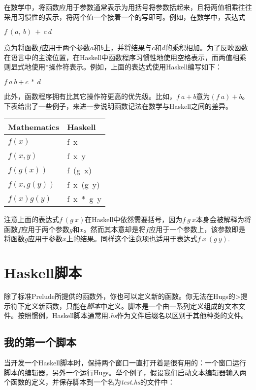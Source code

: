在数学中，将函数应用于参数通常表示为用括号将参数括起来，且将两值相乘往往采用习惯性的表示，将两个值一个接着一个的写即可。例如，在数学中，表达式

\noindent\hspace*{1cm} $f~(a,~b)~+~c~d$

意为将函数$f$应用于两个参数$a$和$b$上，并将结果与$c$和$d$的乘积相加。为了反映函数在语言中的主流位置，在Haskell中函数程序习惯性地使用空格表示，而两值相乘则显式地使用$*$操作符表示。例如，上面的表达式使用Haskell编写如下：

\noindent\hspace*{1cm} $f~a~b + c~*~d$

此外，函数程序拥有比其它操作符更高的优先级。比如，$f~a + b$意为$(f~a) +
b$。下表给出了一些例子，来进一步说明函数记法在数学与Haskell之间的差异。

\begin{table}[htbp]
\label{tab:threesome}
\centering
\begin{tabular}{ll}
\hline
Mathematics & Haskell  \\
\hline
$f(x)$ & f~x \\
$f(x,y)$ & f~x~y \\
$f(g(x))$ & f~(g~x) \\
$f(x,g(y))$ & f~x~(g~y)\\
$f(x)g(y)$ & f~x~*~g~y\\
\hline
\end{tabular}
\end{table}

注意上面的表达式$f~(g~x)$在Haskell中依然需要括号，因为$f~g~
x$本身会被解释为将函数$f$应用于两个参数$g$和$x$。然而其本意却是将$f$应用于一个参数上，该参数即是将函数$g$应用于参数$x$上的结果。同样这个注意项也适用于表达式$f~x~(g~y)$.

\section{Haskell脚本}
除了标准Prelude所提供的函数外，你也可以定义新的函数。你无法在Hugs的>提示符下定义新函数，只能在\textit{脚本}中定义。脚本是一个由一系列定义组成的文本文件。按照惯例，Haskell脚本通常用\textit{.hs}作为文件后缀名以区别于其他种类的文件。

\subsection{我的第一个脚本}
当开发一个Haskell脚本时，保持两个窗口一直打开着是很有用的：一个窗口运行脚本的编辑器，另外一个运行Hugs。举个例子，假设我们启动文本编辑器输入两个函数的定义，并保存脚本到一个名为\textit{test.hs}的文件中：

